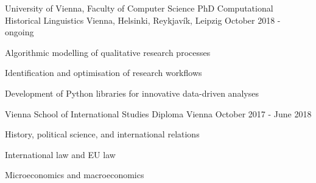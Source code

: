 

\begin{cventries}

  \cventry
    {University of Vienna, Faculty of Computer Science} %
    {PhD Computational Historical Linguistics} %
    {Vienna, Helsinki, Reykjavík, Leipzig} %
    {October 2018 - ongoing} %
    {
      \begin{cvitems} %
        \item{Algorithmic modelling of qualitative research processes}
        \item{Identification and optimisation of research workflows}
        \item{Development of Python libraries for innovative data-driven analyses}
      \end{cvitems}
    }

  \cventry
    {Vienna School of International Studies} %
    {Diploma} %
    {Vienna} %
    {October 2017 - June 2018} %
    {
    \begin{cvitems} %
        \item{History, political science, and international relations}
        \item{International law and EU law}
        \item{Microeconomics and macroeconomics}
      \end{cvitems}
    }
    


\end{cventries}
